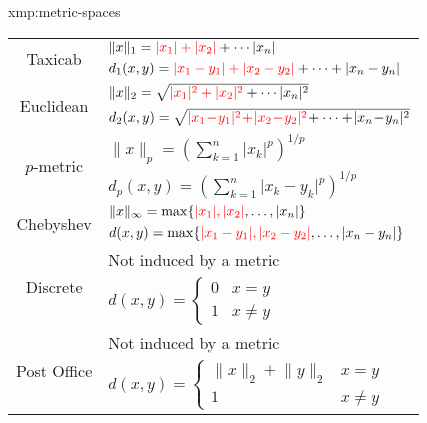 \documentclass[landscape, 8pt]{extarticle}
\begin{document}
\begin{multicols}{3}
\begin{xmp}{xmp:metric-spaces}{}
\begin{center}
\begin{tabular}{|c|l|}
        \hline
        \multirow{2}{*}{Taxicab} & $\lVert x \rVert_{1} = \textcolor{red}{\lvert x_{1} \rvert + \lvert x_{2} \rvert} + \cdots \lvert x_{n} \rvert$ \\
                                 & $d_{1}(x, y) = \textcolor{red}{\lvert x_{1} - y_{1} \rvert + \lvert x_{2} - y_{2} \rvert} + \cdots + \lvert x_{n} - y_{n} \rvert$ \\
        \hline
        \multirow{2}{*}{Euclidean} & $\lVert x \rVert_{2} = \sqrt{\textcolor{red}{\lvert x_{1} \rvert^{2} + \lvert x_{2} \rvert^{2}} + \cdots \lvert x_{n} \rvert^{2}}$ \\
                                   & $d_{2}(x, y) = \sqrt{\textcolor{red}{\lvert x_{1} \! - \! y_{1} \rvert^{2} \! + \! \lvert x_{2} \! - \! y_{2} \rvert^{2}} \! + \cdots + \! \lvert x_{n} \! - \! y_{n} \rvert^{2}}$ \\
        \hline
        \multirow{2}{*}{$p$-metric} & $\lVert x \rVert_{p} = \displaystyle \left( \sum_{k = 1}^{n} \lvert x_{k} \rvert^{p}\right)^{1 /p}$ \\
                          & $d_{p}(x, y) = \displaystyle \left( \sum_{k = 1}^{n} \lvert x_{k} - y_{k} \rvert^{p}\right)^{1 /p}$ \\
        \hline
        \multirow{2}{*}{Chebyshev} & $\lVert x \rVert_{\infty} = \max \{\textcolor{red}{\lvert x_{1} \rvert, \lvert x_{2} \rvert},\dots, \lvert x_{n} \rvert\}$ \\
                                   & $d(x, y) = \max \{\textcolor{red}{\lvert x_{1} - y_{1} \rvert, \lvert x_{2} - y_{2} \rvert},\dots, \lvert x_{n} - y_{n} \rvert\}$ \\

        \hline
        \multirow{2}{*}{Discrete} & Not induced by a metric \\
                          & $d(x, y) = \begin{cases}
                              0 & x = y \\
                              1 & x \ne y
                          \end{cases}$ \\
        \hline
        \multirow{2}{*}{Post Office} & Not induced by a metric \\
                          & $d(x, y) = \begin{cases}
                              \lVert x \rVert_{2} + \lVert y \rVert_{2} & x = y \\
                              1 & x \ne y
                          \end{cases}$ \\
        \hline
    \end{tabular}
    \end{center}


\end{xmp}
\end{multicols}
\end{document}
